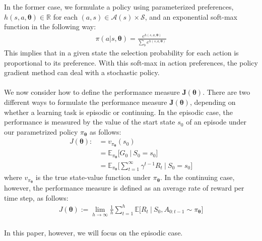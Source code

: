 In the former case, we formulate a policy using parameterized preferences, $h(s,a,\boldsymbol{\theta})\in\mathbb{R}$ for each $(a,s) \in \mathcal{A}(s) \times \mathcal{S}$, and an exponential soft-max function in the following way:
\begin{align}
    \pi(a|s,\boldsymbol{\theta}) = \frac{e^{h(s,a,\boldsymbol{\theta})}}{\sum_b e^{h(s,a,\boldsymbol{\theta})}}
\end{align}
This implies that in a given state the selection probability for each action is proportional to its preference. With this soft-max in action preferences, the policy gradient method can deal with a stochastic policy.\\ \\
We now consider how to define the performance measure $\textbf{J}(\boldsymbol{\theta})$. There are two different ways to formulate the performance measure $\textbf{J}(\boldsymbol{\theta})$, depending on whether a learning task is episodic or continuing. In the episodic case, the performance is measured by the value of the start state $s_0$ of an episode under our parametrized policy $\pi_{\boldsymbol{\theta}}$ as follows:
\begin{align}
    J(\boldsymbol{\theta}) :&= v_{\pi_{\boldsymbol{\theta}}}(s_0) \nonumber\\
    &= \mathbb{E}_{\pi_{\boldsymbol{\theta}}} \big[ G_0 \ | \ S_0 = s_0 \big]\nonumber\\
    &= \mathbb{E}_{\pi_{\boldsymbol{\theta}}} \big[ \sum_{t=1}^{\infty}\gamma^{t-1}R_t \ | \ S_0 = s_0 \big]
\end{align}
where $v_{\pi_{\boldsymbol{\theta}}}$ is the true state-value function under $\pi_{\boldsymbol{\theta}}$. In the continuing case, however, the performance measure is defined as an average rate of reward per time step, as follows:
\begin{align}
    J(\boldsymbol{\theta}) := \lim_{h\rightarrow \infty}\frac{1}{h}\sum_{t=1}^{h}\mathbb{E}\big[ R_t \ | \ S_0, A_{0:t-1}\sim \pi_{\boldsymbol{\theta}} \big]
\end{align}\\
In this paper, however, we will focus on the episodic case.
\clearpage
